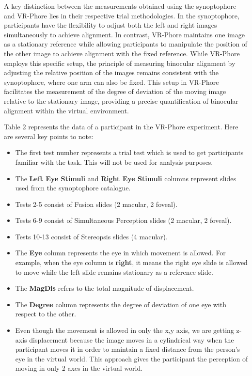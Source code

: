 \documentclass{article}
\begin{document}
A key distinction between the measurements obtained using the synoptophore and VR-Phore lies in their respective trial methodologies. In the synoptophore, participants have the flexibility to adjust both the left and right images simultaneously to achieve alignment. In contrast, VR-Phore maintains one image as a stationary reference while allowing participants to manipulate the position of the other image to achieve alignment with the fixed reference. While VR-Phore employs this specific setup, the principle of measuring binocular alignment by adjusting the relative position of the images remains consistent with the synoptophore, where one arm can also be fixed. This setup in VR-Phore facilitates the measurement of the degree of deviation of the moving image relative to the stationary image, providing a precise quantification of binocular alignment within the virtual environment.

Table 2 represents the data of a participant in the VR-Phore experiment. Here are several key points to note:
    \begin{itemize}
        \item The first test number represents a trial test which is used to get participants familiar with the task. This will not be used for analysis purposes.
        \item The \textbf{Left Eye Stimuli} and \textbf{Right Eye Stimuli} columns represent slides used from the synoptophore catalogue.
        \item Tests 2-5 consist of Fusion slides (2 macular, 2 foveal).
        \item Tests 6-9 consist of Simultaneous Perception slides (2 macular, 2 foveal).
        \item Tests 10-13 consist of Stereopsis slides (4 macular).
        \item The \textbf{Eye} column represents the eye in which movement is allowed. For example, when the eye column is \textbf{right}, it means the right eye slide is allowed to move while the left slide remains stationary as a reference slide.
        \item The \textbf{MagDis} refers to the total magnitude of displacement.
        \item The \textbf{Degree} column represents the degree of deviation of one eye with respect to the other.
        \item Even though the movement is allowed in only the x,y axis, we are getting z-axis displacement because the image moves in a cylindrical way when the participant moves it in order to maintain a fixed distance from the person’s eye in the virtual world. This approach gives the participant the perception of moving in only 2 axes in the virtual world.
    \end{itemize}
\end{document}
